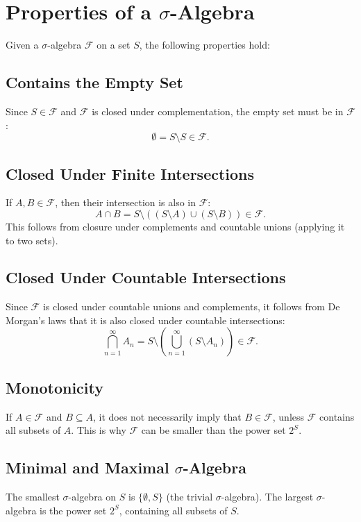 \documentclass{article}
\begin{document}
\section*{Properties of a \(\sigma\)-Algebra}

Given a \(\sigma\)-algebra \(\mathcal{F}\) on a set \(S\), the following properties hold:

\subsection*{Contains the Empty Set}
Since \(S \in \mathcal{F}\) and \(\mathcal{F}\) is closed under complementation, the empty set must be in \(\mathcal{F}\):
\[
\emptyset = S \setminus S \in \mathcal{F}.
\]

\subsection*{Closed Under Finite Intersections}
If \(A, B \in \mathcal{F}\), then their intersection is also in \(\mathcal{F}\):
\[
A \cap B = S \setminus \left( (S \setminus A) \cup (S \setminus B) \right) \in \mathcal{F}.
\]
This follows from closure under complements and countable unions (applying it to two sets).

\subsection*{Closed Under Countable Intersections}
Since \(\mathcal{F}\) is closed under countable unions and complements, it follows from De Morgan’s laws that it is also closed under countable intersections:
\[
\bigcap_{n=1}^{\infty} A_n = S \setminus \left( \bigcup_{n=1}^{\infty} (S \setminus A_n) \right) \in \mathcal{F}.
\]

\subsection*{Monotonicity}
If \(A \in \mathcal{F}\) and \(B \subseteq A\), it does not necessarily imply that \(B \in \mathcal{F}\), unless \(\mathcal{F}\) contains all subsets of \(A\). This is why \(\mathcal{F}\) can be smaller than the power set \(2^S\).

\subsection*{Minimal and Maximal \(\sigma\)-Algebra}
The smallest \(\sigma\)-algebra on \(S\) is \(\{\emptyset, S\}\) (the trivial \(\sigma\)-algebra).  
The largest \(\sigma\)-algebra is the power set \(2^S\), containing all subsets of \(S\).
\end{document}
